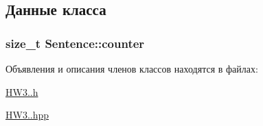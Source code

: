 \subsection{Данные класса}
\subsubsection[{\texorpdfstring{counter}{counter}}]{\setlength{\rightskip}{0pt plus 5cm}size\+\_\+t Sentence\+::counter\hspace{0.3cm}{\ttfamily [private]}}\hypertarget{classSentence_a5ad2286635c8e8620085b48f81ae2457}{}\label{classSentence_a5ad2286635c8e8620085b48f81ae2457}


Объявления и описания членов классов находятся в файлах\+:\begin{DoxyCompactItemize}
\item 
\hyperlink{HW3_81_8h}{H\+W3..\+h}\item 
\hyperlink{HW3_81_8hpp}{H\+W3..\+hpp}\end{DoxyCompactItemize}

